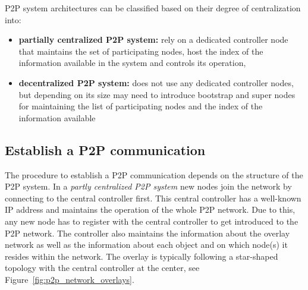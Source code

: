 \gls{P2P} system architectures can be classified based on their degree of centralization into: \@

\begin{itemize}
	\item \textbf{partially centralized \gls{P2P} system:} rely on a dedicated controller node that maintains the set of participating nodes, host the index of the information available in the system and controls its operation,
	\item \textbf{decentralized \gls{P2P} system:} does not use any dedicated controller nodes, but depending on its size may need to introduce bootstrap and super nodes for maintaining the list of participating nodes and the index of the information available
\end{itemize}


\subsection{Establish a \gls{P2P} communication}
\label{sec:p2p_start_communication}

The procedure to establish a \gls{P2P} communication depends on the structure of the \gls{P2P} system. In a \emph{partly centralized \gls{P2P} system} new nodes join the network by connecting to the central controller first. This central controller has a well-known \gls{IP} address and maintains the operation of the whole \gls{P2P} network. Due to this, any new node has to register with the central controller to get introduced to the \gls{P2P} network. The controller also maintains the information about the overlay network as well as the information about each object and on which node(s) it resides within the network. The overlay is typically following a star-shaped topology with the central controller at the center, see Figure~\ref{fig:p2p_network_overlays}. \\

